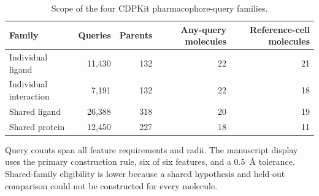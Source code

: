 \begin{table}[htbp]
\centering\footnotesize
\caption{Scope of the four CDPKit pharmacophore-query families.}
\label{tab:cdpkit-query-scope}
\begin{tabular}{lrrrr}
\toprule
\textbf{Family} & \textbf{Queries} & \textbf{Parents} & \textbf{Any-query molecules} & \textbf{Reference-cell molecules} \\
\midrule
Individual ligand & 11,430 & 132 & 22 & 21 \\
Individual interaction & 7,191 & 132 & 22 & 18 \\
Shared ligand & 26,388 & 318 & 20 & 19 \\
Shared protein & 12,450 & 227 & 18 & 11 \\
\bottomrule
\end{tabular}
\par\smallskip
\begin{minipage}{0.95\linewidth}\footnotesize
Query counts span all feature requirements and radii. The manuscript display uses the primary construction rule, six of six features, and a 0.5~\AA{} tolerance. Shared-family eligibility is lower because a shared hypothesis and held-out comparison could not be constructed for every molecule.
\end{minipage}
\end{table}

